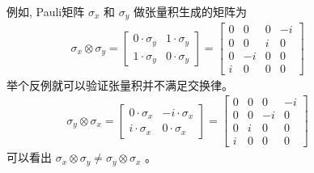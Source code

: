\documentclass[a4paper,11pt,english]{sphinxmanual}
\begin{document}
\sphinxAtStartPar
  例如, Pauli矩阵  \(\sigma_{x}\) 和  \(\sigma_{y}\) 做张量积生成的矩阵为
\begin{equation*}
\begin{split}\sigma_{x} \otimes \sigma_{y}=\left[\begin{array}{cc} 0 \cdot \sigma_{y} & 1 \cdot \sigma_{y} \\ 1 \cdot \sigma_{y} & 0 \cdot \sigma_{y} \end{array}\right]=\left[\begin{array}{cccc} 0 & 0 & 0 & -i \\ 0 & 0 & i & 0 \\ 0 & -i & 0 & 0 \\ i & 0 & 0 & 0 \end{array}\right]\end{split}
\end{equation*}
\sphinxAtStartPar
  举个反例就可以验证张量积并不满足交换律。
\begin{equation*}
\begin{split}\sigma_{y} \otimes \sigma_{x}=\left[\begin{array}{cc} 0 \cdot \sigma_{x} & -i \cdot \sigma_{x} \\ i \cdot \sigma_{x} & 0 \cdot \sigma_{x} \end{array}\right]=\left[\begin{array}{cccc} 0 & 0 & 0 & -i \\ 0 & 0 & -i & 0 \\ 0 & i & 0 & 0 \\ i & 0 & 0 & 0 \end{array}\right]\end{split}
\end{equation*}
\sphinxAtStartPar
  可以看出  \(\sigma_{x} \otimes \sigma_{y} \neq \sigma_{y} \otimes \sigma_{x}\) 。
\end{document}
